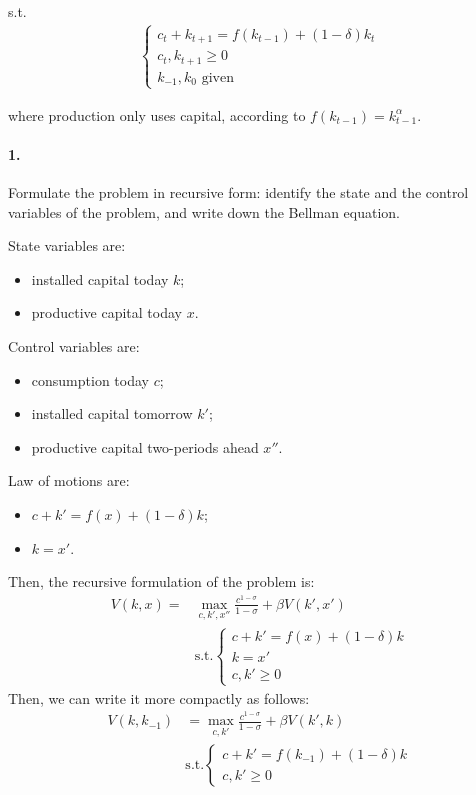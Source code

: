 \documentclass[dvipsnames,11pt]{article}
\begin{document}
    \noindent s.t.
    \begin{align}
        \begin{cases}
        c_t + k_{t+1} = f(k_{t-1}) + (1 - \delta) k_t \\
        c_t, k_{t+1} \geq 0 \\
        k_{-1}, k_0 \text{ given}
        \end{cases}
    \end{align}

    \noindent where production only uses capital, according to $f(k_{t-1}) = k_{t-1}^\alpha$.


\paragraph{1.} Formulate the problem in recursive form: identify the state and the control variables of the problem, and write down the Bellman equation.  
\begin{solution}
State variables are:
\begin{itemize}
    \item installed capital today $k$;
    \item productive capital today $x$.
\end{itemize}
Control variables are:
\begin{itemize}
    \item consumption today $c$;
    \item installed capital tomorrow $k'$;
    \item productive capital two-periods ahead $x''$.
\end{itemize}
Law of motions are:
\begin{itemize}
    \item $c+k'=f(x)+(1-\delta)k$;
    \item $k=x'$.
\end{itemize}
Then, the recursive formulation of the problem is:
\begin{align*}
    V(k,x)=&\max_{c,k',x''}\frac{c^{1-\sigma}}{1-\sigma}+\beta V(k',x')\\
    &\text{s.t.} \begin{cases}
        c+k'=f(x)+(1-\delta)k\\
        k=x' \\
        c,k' \geq 0
    \end{cases}
\end{align*}
Then, we can write it more compactly as follows:
\begin{align*}
    V(k,k_{-1})&=\max_{c,k'} \frac{c^{1-\sigma}}{1-\sigma}+\beta V(k',k) \\
    &\text{s.t.} \begin{cases}
        c+k'=f(k_{-1})+(1-\delta)k \\
        c,k' \geq 0
    \end{cases}
\end{align*}
\end{solution}
\end{document}
